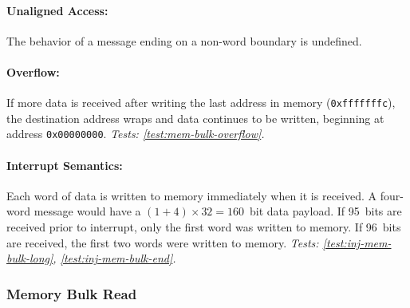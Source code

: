 \paragraph{Unaligned Access:} The behavior of a message ending on a
non-word boundary is undefined.

\paragraph{Overflow:} If more data is received after writing the last
address in memory ({\tt 0xfffffffc}), the destination address wraps and data
continues to be written, beginning at address {\tt 0x00000000}.
{\em Tests: \ref{test:mem-bulk-overflow}.}

\paragraph{Interrupt Semantics:} Each word of data is written to memory
immediately when it is received. A four-word message would have a
$(1+4)\times32=160$~bit data payload. If 95~bits are received prior to
interrupt, only the first word was written to memory. If 96~bits are received,
the first two words were written to memory.
{\em Tests: \ref{test:inj-mem-bulk-long}, \ref{test:inj-mem-bulk-end}.}

\subsubsection{Memory Bulk Read}
\label{cmd:mem-bulk-read}


